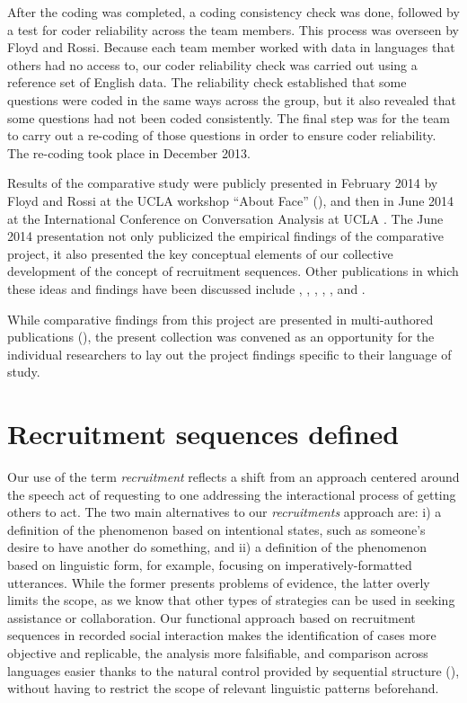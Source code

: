 \documentclass[output=paper,modfonts,nonflat]{langsci/langscibook}
\begin{document}
After the coding was completed, a coding consistency check was done, followed by a test for coder reliability across the team members. This process was overseen by Floyd and Rossi. Because each team member worked with data in languages that others had no access to, our coder reliability check was carried out using a reference set of English data. The reliability check established that some questions were coded in the same ways across the group, but it also revealed that some questions had not been coded consistently. The final step was for the team to carry out a re-coding of those questions in order to ensure coder reliability. The re-coding took place in December 2013.

Results of the comparative study were publicly presented in February 2014 by Floyd and Rossi at the UCLA workshop “About Face” (\citealt{FloydEtAl2014a}), and then in June 2014 at the International Conference on Conversation Analysis at UCLA \citep{FloydEtAl2014b}. The June 2014 presentation not only publicized the empirical findings of the comparative project, it also presented the key conceptual elements of our collective development of the concept of recruitment sequences. Other publications in which these ideas and findings have been discussed include \citet{Enfield2014b}, \citet{DrewCouper-Kuhlen2014b}, \citet{Rossi2015b}, \citet{KendrickDrew2016}, \citet{ZinkenRossi2016}, and \citet{Floyd2017}.

While comparative findings from this project are presented in multi-authored publications (\citealt{FloydEtAl2014b,FloydEtAl2018}), the present collection was convened as an opportunity for the individual researchers to lay out the project findings specific to their language of study.

\section{Recruitment sequences defined}\label{sec:intro:4}

Our use of the term \textit{recruitment} reflects a shift from an approach centered around the speech act of requesting to one addressing the interactional process of getting others to act. The two main alternatives to our \textit{recruitments} approach are: i) a definition of the phenomenon based on intentional states, such as someone’s desire to have another do something, and ii) a definition of the phenomenon based on linguistic form, for example, focusing on imperatively-formatted utterances. While the former presents problems of evidence, the latter overly limits the scope, as we know that other types of strategies can be used in seeking assistance or collaboration. Our functional approach based on recruitment sequences in recorded social interaction makes the identification of cases more objective and replicable, the analysis more falsifiable, and comparison across languages easier thanks to the natural control provided by sequential structure (\citealt{DingemanseFloyd2014}), without having to restrict the scope of relevant linguistic patterns beforehand.
\end{document}
